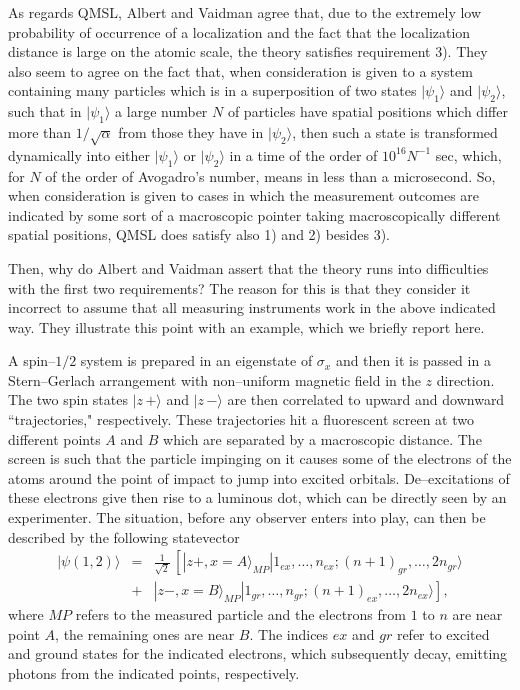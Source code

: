 \documentclass[12pt]{article}
\begin{document}
As regards QMSL, Albert and Vaidman agree that, due to the
extremely low probability of occurrence of a localization and the
fact that the localization distance is large on the atomic scale,
the theory satisfies requirement 3). They also seem to agree on
the fact that, when consideration is given to a system containing
many particles which is in a superposition of two states
$|\psi_{1}\rangle$ and $|\psi_{2}\rangle$, such that in
$|\psi_{1}\rangle$ a large number $N$ of particles have spatial
positions which differ more than $1/\sqrt{\alpha}$ from those they
have in $|\psi_{2}\rangle$, then such a state is transformed
dynamically into either $|\psi_{1}\rangle$ or $|\psi_{2}\rangle$
in a time of the order of $10^{16} N^{-1}$ sec, which, for $N$ of
the order of Avogadro's number, means in less than a microsecond.
So, when consideration is given to cases in which the measurement
outcomes are indicated by some sort of a macroscopic pointer
taking macroscopically different spatial positions, QMSL does
satisfy also 1) and 2) besides 3).

Then, why do Albert and Vaidman assert that the theory runs into
difficulties with the first two requirements? The reason for this
is that they consider it  incorrect to assume that all measuring
instruments work in the above indicated way. They illustrate this
point with an example, which we briefly report here.

A spin--$1/2$ system is prepared in an eigenstate of $\sigma_{x}$
and then it is passed in a Stern--Gerlach arrangement with
non--uniform magnetic field in the $z$ direction. The two spin
states $|z\,+\rangle$ and $|z\,-\rangle$ are then correlated to
upward and downward ``trajectories," respectively. These
trajectories hit a fluorescent screen  at two different
points $A$ and $B$ which are separated by a macroscopic distance.
The screen is such that the particle impinging on it causes some
of the electrons of the atoms around the point of impact to jump
into excited orbitals. De--excitations of these electrons give
then rise to a luminous dot, which can be directly seen by an
experimenter. The situation, before any observer enters into play,
can then be described by the following statevector
\begin{eqnarray} \label{rsp}
|\psi(1,2)\rangle & = & \frac{1}{\sqrt{2}}\,\left[ |z+,
x=A\rangle_{MP} |1_{ex}, \ldots, n_{ex}; (n+1)_{gr}, \ldots,
2n_{gr}\rangle
\right.\nonumber \\
& + & \left. |z-, x=B\rangle_{MP} |1_{gr}, \ldots, n_{gr};
(n+1)_{ex}, \ldots, 2n_{ex}\rangle \right],
\end{eqnarray}
where $MP$ refers to the measured particle and the electrons from
$1$ to $n$ are near point $A$, the remaining ones are near $B$.
The indices $ex$ and $gr$ refer to excited and ground states for
the indicated electrons, which subsequently decay, emitting
photons from the indicated points, respectively.
\end{document}

